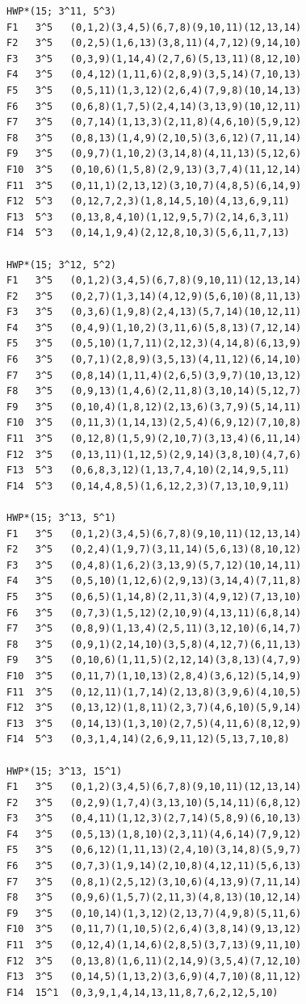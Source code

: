 \documentclass[11pt]{amsart}
\theoremstyle{remark}
\begin{document}
\begingroup\footnotesize
\begin{verbatim}
HWP*(15; 3^11, 5^3)
F1   3^5   (0,1,2)(3,4,5)(6,7,8)(9,10,11)(12,13,14)
F2   3^5   (0,2,5)(1,6,13)(3,8,11)(4,7,12)(9,14,10)
F3   3^5   (0,3,9)(1,14,4)(2,7,6)(5,13,11)(8,12,10)
F4   3^5   (0,4,12)(1,11,6)(2,8,9)(3,5,14)(7,10,13)
F5   3^5   (0,5,11)(1,3,12)(2,6,4)(7,9,8)(10,14,13)
F6   3^5   (0,6,8)(1,7,5)(2,4,14)(3,13,9)(10,12,11)
F7   3^5   (0,7,14)(1,13,3)(2,11,8)(4,6,10)(5,9,12)
F8   3^5   (0,8,13)(1,4,9)(2,10,5)(3,6,12)(7,11,14)
F9   3^5   (0,9,7)(1,10,2)(3,14,8)(4,11,13)(5,12,6)
F10  3^5   (0,10,6)(1,5,8)(2,9,13)(3,7,4)(11,12,14)
F11  3^5   (0,11,1)(2,13,12)(3,10,7)(4,8,5)(6,14,9)
F12  5^3   (0,12,7,2,3)(1,8,14,5,10)(4,13,6,9,11)
F13  5^3   (0,13,8,4,10)(1,12,9,5,7)(2,14,6,3,11)
F14  5^3   (0,14,1,9,4)(2,12,8,10,3)(5,6,11,7,13)

HWP*(15; 3^12, 5^2)
F1   3^5   (0,1,2)(3,4,5)(6,7,8)(9,10,11)(12,13,14)
F2   3^5   (0,2,7)(1,3,14)(4,12,9)(5,6,10)(8,11,13)
F3   3^5   (0,3,6)(1,9,8)(2,4,13)(5,7,14)(10,12,11)
F4   3^5   (0,4,9)(1,10,2)(3,11,6)(5,8,13)(7,12,14)
F5   3^5   (0,5,10)(1,7,11)(2,12,3)(4,14,8)(6,13,9)
F6   3^5   (0,7,1)(2,8,9)(3,5,13)(4,11,12)(6,14,10)
F7   3^5   (0,8,14)(1,11,4)(2,6,5)(3,9,7)(10,13,12)
F8   3^5   (0,9,13)(1,4,6)(2,11,8)(3,10,14)(5,12,7)
F9   3^5   (0,10,4)(1,8,12)(2,13,6)(3,7,9)(5,14,11)
F10  3^5   (0,11,3)(1,14,13)(2,5,4)(6,9,12)(7,10,8)
F11  3^5   (0,12,8)(1,5,9)(2,10,7)(3,13,4)(6,11,14)
F12  3^5   (0,13,11)(1,12,5)(2,9,14)(3,8,10)(4,7,6)
F13  5^3   (0,6,8,3,12)(1,13,7,4,10)(2,14,9,5,11)
F14  5^3   (0,14,4,8,5)(1,6,12,2,3)(7,13,10,9,11)

HWP*(15; 3^13, 5^1)
F1   3^5   (0,1,2)(3,4,5)(6,7,8)(9,10,11)(12,13,14)
F2   3^5   (0,2,4)(1,9,7)(3,11,14)(5,6,13)(8,10,12)
F3   3^5   (0,4,8)(1,6,2)(3,13,9)(5,7,12)(10,14,11)
F4   3^5   (0,5,10)(1,12,6)(2,9,13)(3,14,4)(7,11,8)
F5   3^5   (0,6,5)(1,14,8)(2,11,3)(4,9,12)(7,13,10)
F6   3^5   (0,7,3)(1,5,12)(2,10,9)(4,13,11)(6,8,14)
F7   3^5   (0,8,9)(1,13,4)(2,5,11)(3,12,10)(6,14,7)
F8   3^5   (0,9,1)(2,14,10)(3,5,8)(4,12,7)(6,11,13)
F9   3^5   (0,10,6)(1,11,5)(2,12,14)(3,8,13)(4,7,9)
F10  3^5   (0,11,7)(1,10,13)(2,8,4)(3,6,12)(5,14,9)
F11  3^5   (0,12,11)(1,7,14)(2,13,8)(3,9,6)(4,10,5)
F12  3^5   (0,13,12)(1,8,11)(2,3,7)(4,6,10)(5,9,14)
F13  3^5   (0,14,13)(1,3,10)(2,7,5)(4,11,6)(8,12,9)
F14  5^3   (0,3,1,4,14)(2,6,9,11,12)(5,13,7,10,8)

HWP*(15; 3^13, 15^1)
F1   3^5   (0,1,2)(3,4,5)(6,7,8)(9,10,11)(12,13,14)
F2   3^5   (0,2,9)(1,7,4)(3,13,10)(5,14,11)(6,8,12)
F3   3^5   (0,4,11)(1,12,3)(2,7,14)(5,8,9)(6,10,13)
F4   3^5   (0,5,13)(1,8,10)(2,3,11)(4,6,14)(7,9,12)
F5   3^5   (0,6,12)(1,11,13)(2,4,10)(3,14,8)(5,9,7)
F6   3^5   (0,7,3)(1,9,14)(2,10,8)(4,12,11)(5,6,13)
F7   3^5   (0,8,1)(2,5,12)(3,10,6)(4,13,9)(7,11,14)
F8   3^5   (0,9,6)(1,5,7)(2,11,3)(4,8,13)(10,12,14)
F9   3^5   (0,10,14)(1,3,12)(2,13,7)(4,9,8)(5,11,6)
F10  3^5   (0,11,7)(1,10,5)(2,6,4)(3,8,14)(9,13,12)
F11  3^5   (0,12,4)(1,14,6)(2,8,5)(3,7,13)(9,11,10)
F12  3^5   (0,13,8)(1,6,11)(2,14,9)(3,5,4)(7,12,10)
F13  3^5   (0,14,5)(1,13,2)(3,6,9)(4,7,10)(8,11,12)
F14  15^1  (0,3,9,1,4,14,13,11,8,7,6,2,12,5,10)
\end{verbatim}
\endgroup
\end{document}
